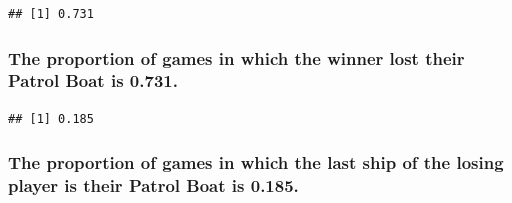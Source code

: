 \documentclass[
]{article}
\newenvironment{Shaded}{\begin{snugshade}}{\end{snugshade}}
\newcommand{\CommentTok}[1]{\textcolor[rgb]{0.56,0.35,0.01}{\textit{#1}}}
\newcommand{\ControlFlowTok}[1]{\textcolor[rgb]{0.13,0.29,0.53}{\textbf{#1}}}
\newcommand{\DecValTok}[1]{\textcolor[rgb]{0.00,0.00,0.81}{#1}}
\newcommand{\FunctionTok}[1]{\textcolor[rgb]{0.13,0.29,0.53}{\textbf{#1}}}
\newcommand{\NormalTok}[1]{#1}
\newcommand{\OtherTok}[1]{\textcolor[rgb]{0.56,0.35,0.01}{#1}}
\newcommand{\SpecialCharTok}[1]{\textcolor[rgb]{0.81,0.36,0.00}{\textbf{#1}}}
\begin{document}
\begin{verbatim}
## [1] 0.731
\end{verbatim}

\subsubsection{The proportion of games in which the winner lost their
Patrol Boat is
0.731.}\label{the-proportion-of-games-in-which-the-winner-lost-their-patrol-boat-is-0.731.}

\begin{Shaded}
\end{Shaded}

\begin{verbatim}
## [1] 0.185
\end{verbatim}

\subsubsection{The proportion of games in which the last ship of the
losing player is their Patrol Boat is
0.185.}\label{the-proportion-of-games-in-which-the-last-ship-of-the-losing-player-is-their-patrol-boat-is-0.185.}
\end{document}
